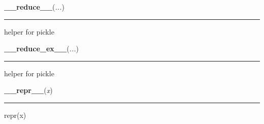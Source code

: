     \label{object:__reduce__}

    \vspace{0.5ex}

    \begin{boxedminipage}{\textwidth}

    \raggedright \textbf{\_\_reduce\_\_}(\textit{...})

    \vspace{-1.5ex}

    \rule{\textwidth}{0.5\fboxrule}
    helper for pickle

    \vspace{1ex}

    \end{boxedminipage}

    \label{object:__reduce_ex__}

    \vspace{0.5ex}

    \begin{boxedminipage}{\textwidth}

    \raggedright \textbf{\_\_reduce\_ex\_\_}(\textit{...})

    \vspace{-1.5ex}

    \rule{\textwidth}{0.5\fboxrule}
    helper for pickle

    \vspace{1ex}

    \end{boxedminipage}

    \label{object:__repr__}

    \vspace{0.5ex}

    \begin{boxedminipage}{\textwidth}

    \raggedright \textbf{\_\_repr\_\_}(\textit{x})

    \vspace{-1.5ex}

    \rule{\textwidth}{0.5\fboxrule}
    repr(x)

    \vspace{1ex}

    \end{boxedminipage}

    \label{object:__setattr__}

